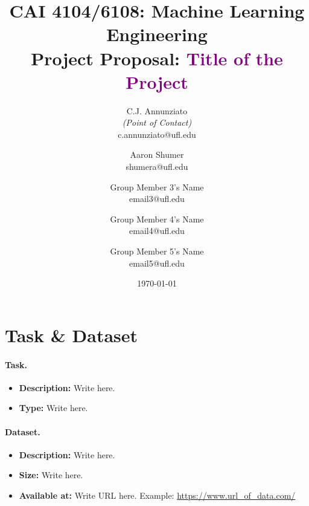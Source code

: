 \documentclass[10pt]{article}
\title{CAI 4104/6108: Machine Learning Engineering\\
	\Large Project Proposal: {\textcolor{purple}{Title of the Project}}} %
\author{
        C.J. Annunziato \\{\em (Point of Contact)} \\
        c.annunziato@ufl.edu\\
        \and
        Aaron Shumer \\
        shumera@ufl.edu\\
        \and
        Group Member 3's Name \\
        email3@ufl.edu\\
        \and
        Group Member 4's Name \\
        email4@ufl.edu\\
        \and
        Group Member 5's Name \\
        email5@ufl.edu\\
}
\date{\today}
\begin{document}

\maketitle




\section*{Task \& Dataset}


\paragraph{Task.} 

\begin{itemize}

\item {\bf Description: } Write here. %

\item {\bf Type: } Write here. %

\end{itemize}

\paragraph{Dataset.} 
%
\begin{itemize}

\item {\bf Description: } Write here. %

\item {\bf Size: } Write here. %

\item {\bf Available at: } Write URL here. Example: \url{https://www.url\_of\_data.com/} %

\end{itemize}
\end{document}
